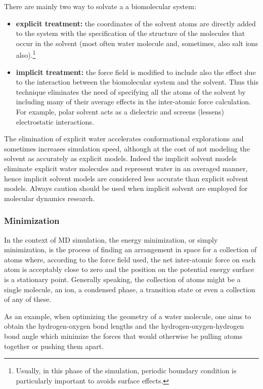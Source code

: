 There are mainly two way to solvate a a biomolecular system:
\begin{itemize}
\item \textbf{explicit treatment:} the coordinates of the solvent atoms are directly added to the system with the specification of the structure of the molecules that occur in the solvent (most often water molecule and, sometimes, also salt ions also).\footnote{Usually, in this phase of the simulation, periodic boundary condition is particularly important to avoids surface effects.} 
\item \textbf{implicit treatment:} the force field is modified to include also the effect due to the interaction between the biomolecular system and the solvent. Thus this technique eliminates the need of specifying all the atoms of the solvent by including many of their average effects in the inter-atomic force calculation. For example, polar solvent acts as a dielectric and screens (lessens) electrostatic interactions. 
\end{itemize}

The elimination of explicit water accelerates conformational explorations and sometimes increases simulation speed, although at the cost of not modeling the solvent as accurately as explicit models.
Indeed the implicit solvent models eliminate explicit water molecules and represent water in an averaged manner, hence implicit solvent models are considered less accurate than explicit solvent models. Always caution should be used when implicit solvent are employed for molecular dynamics research.

\subsubsection{Minimization}
In the context of MD simulation, the energy minimization, or simply minimization, is the process of finding an arrangement in space for a collection of atoms where, according to the force field used, the net inter-atomic force on each atom is acceptably close to zero and the position on the potential energy surface is a stationary point. Generally speaking, the collection of atoms might be a single molecule, an ion, a condensed phase, a transition state or even a collection of any of these. 

As an example, when optimizing the geometry of a water molecule, one aims to obtain the hydrogen-oxygen bond lengths and the hydrogen-oxygen-hydrogen bond angle which minimize the forces that would otherwise be pulling atoms together or pushing them apart.

